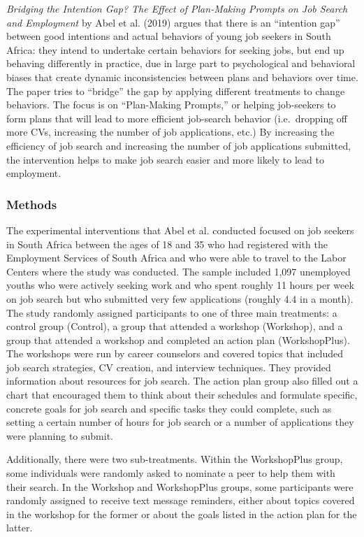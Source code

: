 \documentclass[]{elsarticle} %
\begin{document}
\emph{Bridging the Intention Gap? The Effect of Plan-Making Prompts on
Job Search and Employment} by Abel et al. (2019) argues that there is an
``intention gap'' between good intentions and actual behaviors of young
job seekers in South Africa: they intend to undertake certain behaviors
for seeking jobs, but end up behaving differently in practice, due in
large part to psychological and behavioral biases that create dynamic
inconsistencies between plans and behaviors over time. The paper tries
to ``bridge'' the gap by applying different treatments to change
behaviors. The focus is on ``Plan-Making Prompts,'' or helping
job-seekers to form plans that will lead to more efficient job-search
behavior (i.e.~dropping off more CVs, increasing the number of job
applications, etc.) By increasing the efficiency of job search and
increasing the number of job applications submitted, the intervention
helps to make job search easier and more likely to lead to employment.

\subsubsection{Methods}\label{methods}

The experimental interventions that Abel et al. conducted focused on job
seekers in South Africa between the ages of 18 and 35 who had registered
with the Employment Services of South Africa and who were able to travel
to the Labor Centers where the study was conducted. The sample included
1,097 unemployed youths who were actively seeking work and who spent
roughly 11 hours per week on job search but who submitted very few
applications (roughly 4.4 in a month). The study randomly assigned
participants to one of three main treatments: a control group (Control),
a group that attended a workshop (Workshop), and a group that attended a
workshop and completed an action plan (WorkshopPlus). The workshops were
run by career counselors and covered topics that included job search
strategies, CV creation, and interview techniques. They provided
information about resources for job search. The action plan group also
filled out a chart that encouraged them to think about their schedules
and formulate specific, concrete goals for job search and specific tasks
they could complete, such as setting a certain number of hours for job
search or a number of applications they were planning to submit.

Additionally, there were two sub-treatments. Within the WorkshopPlus
group, some individuals were randomly asked to nominate a peer to help
them with their search. In the Workshop and WorkshopPlus groups, some
participants were randomly assigned to receive text message reminders,
either about topics covered in the workshop for the former or about the
goals listed in the action plan for the latter.
\end{document}
